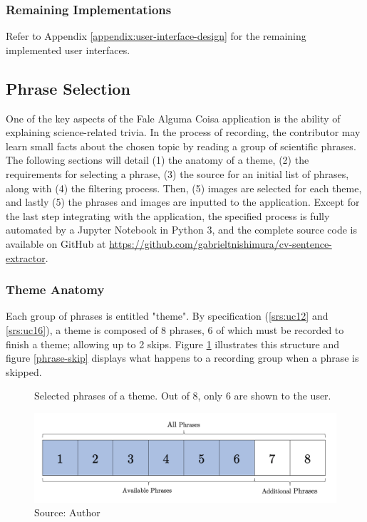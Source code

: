\subsubsection{Remaining Implementations}

Refer to Appendix \ref{appendix:user-interface-design} for the remaining implemented user interfaces.

\clearpage
\subsection{Phrase Selection}
\label{sec:app-phrase-selection}

One of the key aspects of the Fale Alguma Coisa application is the ability of explaining science-related trivia. In the process of recording, the contributor may learn small facts about the chosen topic by reading a group of scientific phrases. The following sections will detail (1) the anatomy of a theme, (2) the requirements for selecting a phrase, (3) the source for an initial list of phrases, along with (4) the filtering process. Then, (5) images are selected for each theme, and lastly (5) the phrases and images are inputted to the application. Except for the last step integrating with the application, the specified process is fully automated by a Jupyter Notebook in Python 3, and the complete source code is available on GitHub at \url{https://github.com/gabrieltnishimura/cv-sentence-extractor}.

\subsubsection{Theme Anatomy}

Each group of phrases is entitled "theme". By specification (\ref{srs:uc12} and \ref{srs:uc16}), a theme is composed of 8 phrases, 6 of which must be recorded to finish a theme; allowing up to 2 skips. Figure \ref{fig:falealgumacoisa-phrase-all} illustrates this structure and figure \ref{phrase-skip} displays what happens to a recording group when a phrase is skipped.

\begin{figure}[h]
    \centering
    \caption{Selected phrases of a theme. Out of 8, only 6 are shown to the user.}
    \includegraphics[width=\linewidth]{images/sw-req-spec/phrase-all.png}
    \caption*{Source: Author}
    \label{fig:falealgumacoisa-phrase-all}
\end{figure}

